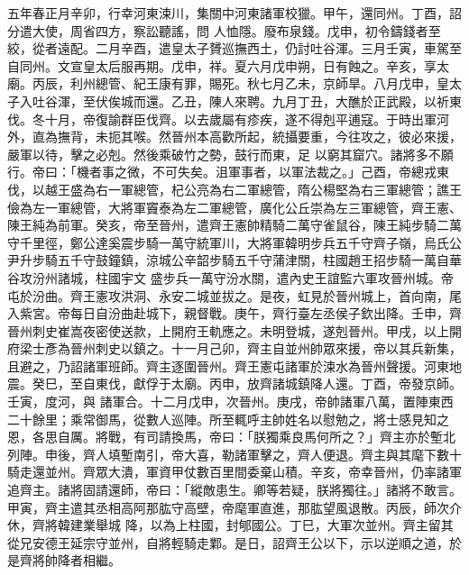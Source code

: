 \begin{pinyinscope}
 五年春正月辛卯，行幸河東涑川，集關中河東諸軍校獵。甲午，還同州。丁酉，詔分遣大使，周省四方，察訟聽謠，問
 人恤隱。廢布泉錢。戊申，初令鑄錢者至絞，從者遠配。二月辛酉，遣皇太子贇巡撫西土，仍討吐谷渾。三月壬寅，車駕至自同州。文宣皇太后服再期。戊申，祥。夏六月戊申朔，日有蝕之。辛亥，享太廟。丙辰，利州總管、紀王康有罪，賜死。秋七月乙未，京師旱。八月戊申，皇太子入吐谷渾，至伏俟城而還。乙丑，陳人來聘。九月丁丑，大醮於正武殿，以祈東伐。冬十月，帝復諭群臣伐齊。以去歲屬有疹疾，遂不得剋平逋寇。于時出軍河外，直為撫背，未扼其喉。然晉州本高歡所起，統攝要重，今往攻之，彼必來援，嚴軍以待，擊之必剋。然後乘破竹之勢，鼓行而東，足
 以窮其窟穴。諸將多不願行。帝曰：「機者事之微，不可失矣。沮軍事者，以軍法裁之。」己酉，帝總戎東伐，以越王盛為右一軍總管，杞公亮為右二軍總管，隋公楊堅為右三軍總管；譙王儉為左一軍總管，大將軍竇泰為左二軍總管，廣化公丘崇為左三軍總管，齊王憲、陳王純為前軍。癸亥，帝至晉州，遣齊王憲帥精騎二萬守雀鼠谷，陳王純步騎二萬守千里徑，鄭公達奚震步騎一萬守統軍川，大將軍韓明步兵五千守齊子嶺，烏氏公尹升步騎五千守鼓鐘鎮，涼城公辛韶步騎五千守蒲津關，柱國趙王招步騎一萬自華谷攻汾州諸城，柱國宇文
 盛步兵一萬守汾水關，遣內史王誼監六軍攻晉州城。帝屯於汾曲。齊王憲攻洪洞、永安二城並拔之。是夜，虹見於晉州城上，首向南，尾入紫宮。帝每日自汾曲赴城下，親督戰。庚午，齊行臺左丞侯子欽出降。壬申，齊晉州刺史崔嵩夜密使送款，上開府王軌應之。未明登城，遂剋晉州。甲戌，以上開府梁士彥為晉州刺史以鎮之。十一月己卯，齊主自並州帥眾來援，帝以其兵新集，且避之，乃詔諸軍班師。齊主逐圍晉州。齊王憲屯諸軍於涑水為晉州聲援。河東地震。癸巳，至自東伐，獻俘于太廟。丙申，放齊諸城鎮降人還。丁酉，帝發京師。壬寅，度河，與
 諸軍合。十二月戊申，次晉州。庚戌，帝帥諸軍八萬，置陣東西二十餘里；乘常御馬，從數人巡陣。所至輒呼主帥姓名以慰勉之，將士感見知之恩，各思自厲。將戰，有司請換馬，帝曰：「朕獨乘良馬何所之？」齊主亦於塹北列陣。申後，齊人填塹南引，帝大喜，勒諸軍擊之，齊人便退。齊主與其麾下數十騎走還並州。齊眾大潰，軍資甲仗數百里間委棄山積。辛亥，帝幸晉州，仍率諸軍追齊主。諸將固請還師，帝曰：「縱敵患生。卿等若疑，朕將獨往。」諸將不敢言。甲寅，齊主遣其丞相高阿那肱守高壁，帝麾軍直進，那肱望風退散。丙辰，師次介休，齊將韓建業舉城
 降，以為上柱國，封郇國公。丁巳，大軍次並州。齊主留其從兄安德王延宗守並州，自將輕騎走鄴。是日，詔齊王公以下，示以逆順之道，於是齊將帥降者相繼。




\end{pinyinscope}
